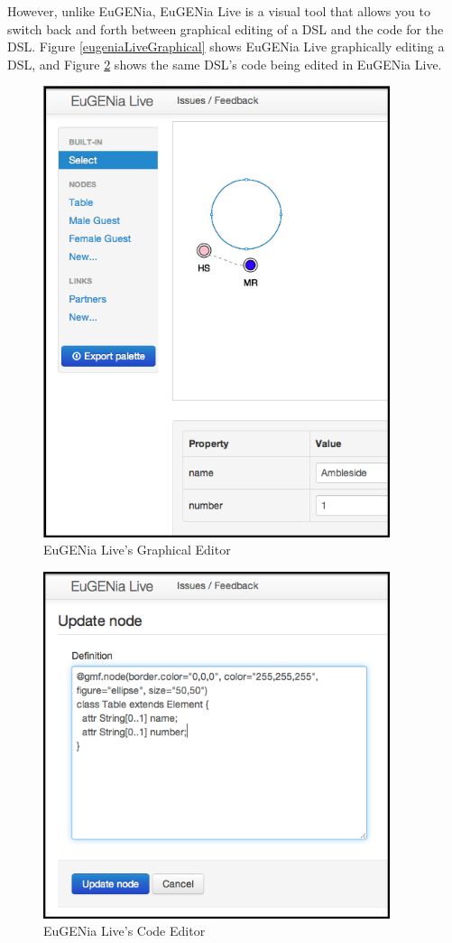However, unlike EuGENia, EuGENia  Live is a visual tool that allows you to switch back and forth between graphical editing of a DSL and the code for the DSL. Figure \ref{eugeniaLiveGraphical} shows EuGENia Live graphically editing a DSL, and Figure \ref{eugeniaLiveCode} shows the same DSL's code being edited in EuGENia Live.

\begin{figure}[h]
\begin{center}
	\includegraphics[width=4in]{figures/eugenia_live_graphical.png}
\end{center}
\caption{EuGENia Live's Graphical Editor \citep{eugeniaLiveDocumentation}}
\label{eugeniaLiveGraphcal}
\end{figure}

\begin{figure}[h]
\begin{center}
	\includegraphics[width=4in]{figures/eugenia_live_code.png}
\end{center}
\caption{EuGENia Live's Code Editor \citep{eugeniaLiveDocumentation}}
\label{eugeniaLiveCode}
\end{figure}


